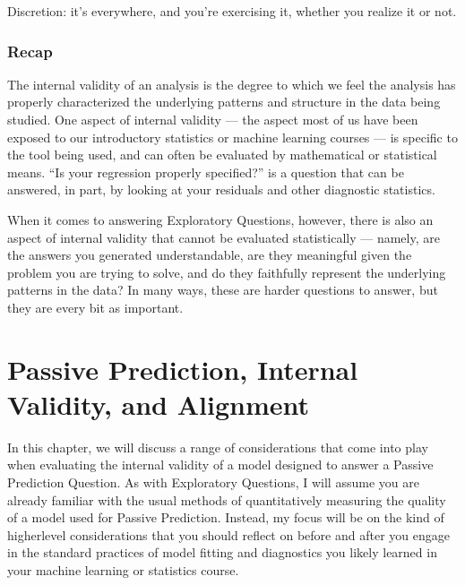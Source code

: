 \documentclass[letterpaper,10pt,english]{jupyterBook}
\begin{document}
\sphinxAtStartPar
Discretion: it’s everywhere, and you’re exercising it, whether you realize it or not.


\subsection{Recap}
\label{\detokenize{30_questions/19_exploratory_internal_meaningful:recap}}
\sphinxAtStartPar
The internal validity of an analysis is the degree to which we feel the analysis has properly characterized the underlying patterns and structure in the data being studied. One aspect of internal validity — the aspect most of us have been exposed to our introductory statistics or machine learning courses — is specific to the tool being used, and can often be evaluated by mathematical or statistical means. “Is your regression properly specified?” is a question that can be answered, in part, by looking at your residuals and other diagnostic statistics.

\sphinxAtStartPar
When it comes to answering Exploratory Questions, however, there is also an aspect of internal validity that cannot be evaluated statistically — namely, are the answers you generated understandable, are they meaningful given the problem you are trying to solve, and do they faithfully represent the underlying patterns in the data? In many ways, these are harder questions to answer, but they are every bit as important.

\sphinxstepscope


\chapter{Passive Prediction, Internal Validity, and Alignment}
\label{\detokenize{30_questions/23_passive_internal_alignment_and_bias:passive-prediction-internal-validity-and-alignment}}\label{\detokenize{30_questions/23_passive_internal_alignment_and_bias::doc}}
\sphinxAtStartPar
In this chapter, we will discuss a range of considerations that come into play when evaluating the internal validity of a model designed to answer a Passive Prediction Question. As with Exploratory Questions, I will assume you are already familiar with the usual methods of quantitatively measuring the quality of a model used for Passive Prediction. Instead, my focus will be on the kind of higher\sphinxhyphen{}level considerations that you should reflect on before and after you engage in the standard practices of model fitting and diagnostics you likely learned in your machine learning or statistics course.
\end{document}
